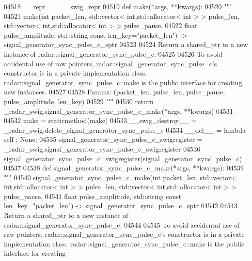 \begin{DoxyCode}
{{{{{{{{{{{{{{{{04518     \_\_repr\_\_ = \_swig\_repr
04519     \textcolor{keyword}{def }make(*args, **kwargs):
04520         \textcolor{stringliteral}{"""}
04521 \textcolor{stringliteral}{        make(int packet\_len, std::vector< int,std::allocator< int > > pulse\_len, std::vector<
       int,std::allocator< int > > pulse\_pause, }
04522 \textcolor{stringliteral}{            float pulse\_amplitude, std::string const len\_key="packet\_len") ->
       signal\_generator\_sync\_pulse\_c\_sptr}
04523 \textcolor{stringliteral}{}
04524 \textcolor{stringliteral}{        Return a shared\_ptr to a new instance of radar::signal\_generator\_sync\_pulse\_c.}
04525 \textcolor{stringliteral}{}
04526 \textcolor{stringliteral}{        To avoid accidental use of raw pointers, radar::signal\_generator\_sync\_pulse\_c's constructor is in a
       private implementation class. radar::signal\_generator\_sync\_pulse\_c::make is the public interface for
       creating new instances.}
04527 \textcolor{stringliteral}{}
04528 \textcolor{stringliteral}{        Params: (packet\_len, pulse\_len, pulse\_pause, pulse\_amplitude, len\_key)}
04529 \textcolor{stringliteral}{        """}
04530         \textcolor{keywordflow}{return} \_radar\_swig.signal\_generator\_sync\_pulse\_c\_make(*args, **kwargs)
04531 
04532     make = staticmethod(make)
04533     \_\_swig\_destroy\_\_ = \_radar\_swig.delete\_signal\_generator\_sync\_pulse\_c
04534     \_\_del\_\_ = \textcolor{keyword}{lambda} self : \textcolor{keywordtype}{None};
04535 signal\_generator\_sync\_pulse\_c\_swigregister = \_radar\_swig.signal\_generator\_sync\_pulse\_c\_swigregister
04536 signal_generator_sync_pulse_c_swigregister(signal\_generator\_sync\_pulse\_c)
04537 
04538 \textcolor{keyword}{def }signal_generator_sync_pulse_c_make(*args, **kwargs):
04539   \textcolor{stringliteral}{"""}
04540 \textcolor{stringliteral}{    signal\_generator\_sync\_pulse\_c\_make(int packet\_len, std::vector< int,std::allocator< int > > pulse\_len,
       std::vector< int,std::allocator< int > > pulse\_pause, }
04541 \textcolor{stringliteral}{        float pulse\_amplitude, std::string const len\_key="packet\_len") ->
       signal\_generator\_sync\_pulse\_c\_sptr}
04542 \textcolor{stringliteral}{}
04543 \textcolor{stringliteral}{    Return a shared\_ptr to a new instance of radar::signal\_generator\_sync\_pulse\_c.}
04544 \textcolor{stringliteral}{}
04545 \textcolor{stringliteral}{    To avoid accidental use of raw pointers, radar::signal\_generator\_sync\_pulse\_c's constructor is in a
       private implementation class. radar::signal\_generator\_sync\_pulse\_c::make is the public interface for creating
}}}}}}}}}}}}}}}}}
\end{DoxyCode}
